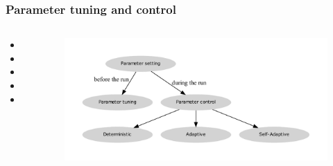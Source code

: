 \begin{frame}
	\frametitle{Parameter tuning and control}
	
	\begin{columns}[c]
		

		\begin{itemize}
			\item 
			\item 
			\item 
			\item
			\item
		\end{itemize}
		
		\begin{figure}
			\includegraphics[width=1\textwidth]{figures/flowchart_parameter_control}
		\end{figure}

	\end{columns}
	
\end{frame}